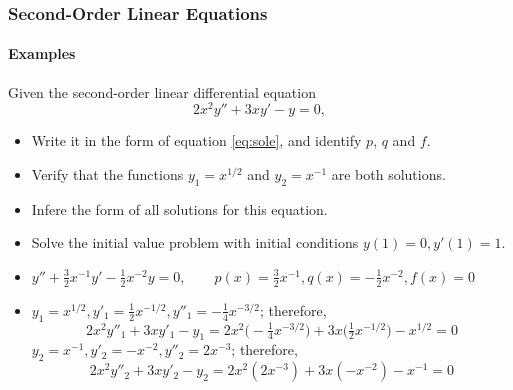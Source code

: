 \documentclass[9pt,xcolor=x11names,compress]{beamer}
\begin{document}
\begin{frame}\frametitle{Second-Order Linear Equations}
\framesubtitle{Examples}
\begin{block}{Given the second-order linear differential equation}
\begin{equation*}
	2x^2y''+3xy'-y=0,
\end{equation*}
\begin{itemize}
	\item \alert<2>{Write it in the form of equation \eqref{eq:sole}, and identify $p$, $q$ and $f$.}
	\item \alert<3>{Verify that the functions $y_1=x^{1/2}$ and $y_2=x^{-1}$ are both solutions.}
	\item Infere the form of all solutions for this equation.
	\item Solve the initial value problem with initial conditions $y(1)=0, y'(1)=1$.
\end{itemize}
\end{block}
\begin{itemize}
	\item<2-> $y''+\tfrac{3}{2}x^{-1}y'-\tfrac{1}{2}x^{-2}y=0,\qquad p(x)=\tfrac{3}{2}x^{-1}, q(x)=-\tfrac{1}{2}x^{-2}, f(x)=0$
	\item<3-> $y_1=x^{1/2}, y'_1=\tfrac{1}{2}x^{-1/2}, y''_1=-\tfrac{1}{4}x^{-3/2}$; therefore, 
	\begin{equation*}
	2x^2y''_1+3xy'_1-y_1=2x^2\big( -\tfrac{1}{4} x^{-3/2} \big)+3x \big( \tfrac{1}{2}x^{-1/2}\big)-x^{1/2}=0
	\end{equation*}
	$y_2=x^{-1}, y'_2=-x^{-2}, y''_2=2x^{-3}$; therefore, 
	\begin{equation*}
	2x^2y''_2+3xy'_2-y_2=2x^2(2x^{-3})+3x (-x^{-2})-x^{-1}=0
	\end{equation*}
\end{itemize}
\end{frame}
\end{document}
